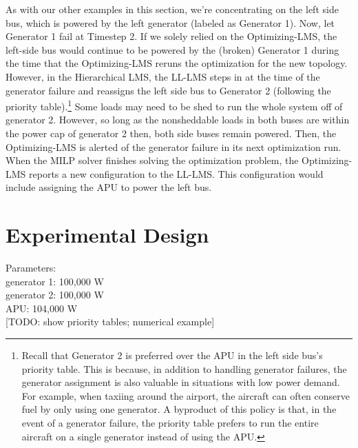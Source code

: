 \documentclass{acm_proc_article-sp}
\begin{document}
As with our other examples in this section, we're concentrating on the left side bus, which is powered by the left generator (labeled as Generator 1).
Now, let Generator 1 fail at Timestep 2. 
If we solely relied on the Optimizing-LMS, the left-side bus would continue to be powered by the (broken) Generator 1 during the time that the Optimizing-LMS reruns the optimization for the new topology.
However, in the Hierarchical LMS, the LL-LMS steps in at the time of the generator failure and reassigns the left side bus to Generator 2 (following the priority table).\footnote{Recall that Generator 2 is preferred over the APU in the left side bus's priority table. This is because, in addition to handling generator failures, the generator assignment is also valuable in situations with low power demand. For example, when taxiing around the airport, the aircraft can often conserve fuel by only using one generator. A byproduct of this policy is that, in the event of a generator failure, the priority table prefers to run the entire aircraft on a single generator instead of using the APU.}
Some loads may need to be shed to run the whole system off of generator 2.
However, so long as the nonsheddable loads in both buses are within the power cap of generator 2 then, both side buses remain powered. 
Then, the Optimizing-LMS is alerted of the generator failure in its next optimization run. 
When the MILP solver finishes solving the optimization problem, the Optimizing-LMS reports a new configuration to the LL-LMS. 
This configuration would include assigning the APU to power the left bus.


\section{Experimental Design}

Parameters: \\
generator 1: 100,000 W \\
generator 2: 100,000 W \\
APU: 104,000 W \\


[TODO: show priority tables; numerical example]
\end{document}
